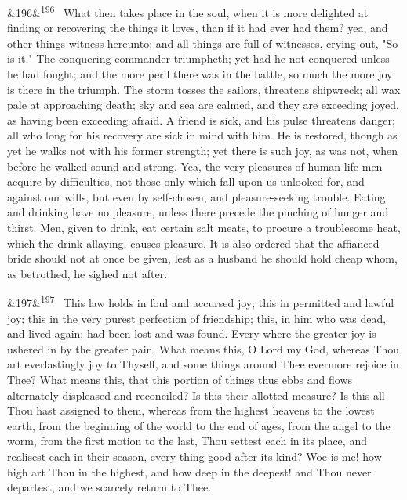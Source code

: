 \documentclass[12pt]{article}
\newcommand{\para}[1][]{\par\noindent\ifx&#1&\else\textsuperscript{\footnotesize #1}~\fi}
\begin{document}
\para[196] What then takes place in the soul, when it is more delighted at finding or recovering the things it loves, than if it had ever had them? yea, and other things witness hereunto; and all things are full of witnesses, crying out, "So is it." The conquering commander triumpheth; yet had he not conquered unless he had fought; and the more peril there was in the battle, so much the more joy is there in the triumph. The storm tosses the sailors, threatens shipwreck; all wax pale at approaching death; sky and sea are calmed, and they are exceeding joyed, as having been exceeding afraid. A friend is sick, and his pulse threatens danger; all who long for his recovery are sick in mind with him. He is restored, though as yet he walks not with his former strength; yet there is such joy, as was not, when before he walked sound and strong. Yea, the very pleasures of human life men acquire by difficulties, not those only which fall upon us unlooked for, and against our wills, but even by self-chosen, and pleasure-seeking trouble. Eating and drinking have no pleasure, unless there precede the pinching of hunger and thirst. Men, given to drink, eat certain salt meats, to procure a troublesome heat, which the drink allaying, causes pleasure. It is also ordered that the affianced bride should not at once be given, lest as a husband he should hold cheap whom, as betrothed, he sighed not after.

\para[197] This law holds in foul and accursed joy; this in permitted and lawful joy; this in the very purest perfection of friendship; this, in him who was dead, and lived again; had been lost and was found. Every where the greater joy is ushered in by the greater pain. What means this, O Lord my God, whereas Thou art everlastingly joy to Thyself, and some things around Thee evermore rejoice in Thee? What means this, that this portion of things thus ebbs and flows alternately displeased and reconciled? Is this their allotted measure? Is this all Thou hast assigned to them, whereas from the highest heavens to the lowest earth, from the beginning of the world to the end of ages, from the angel to the worm, from the first motion to the last, Thou settest each in its place, and realisest each in their season, every thing good after its kind? Woe is me! how high art Thou in the highest, and how deep in the deepest! and Thou never departest, and we scarcely return to Thee.
\end{document}
